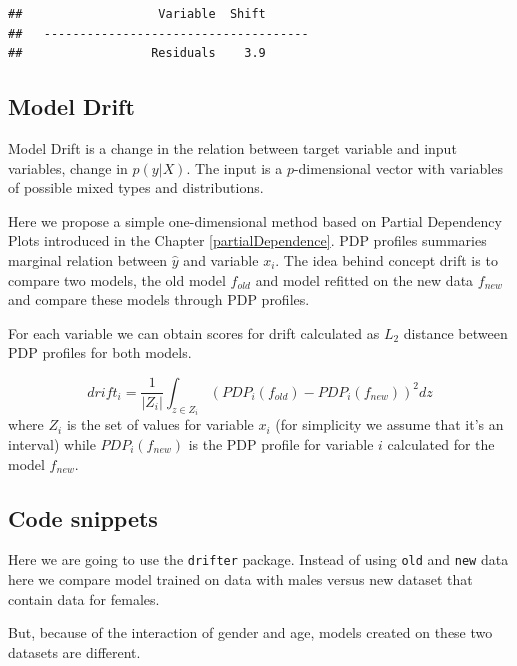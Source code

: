 \documentclass[12pt,]{krantz}
\theoremstyle{definition}
\theoremstyle{definition}
\theoremstyle{definition}
\theoremstyle{remark}
\begin{document}
\begin{verbatim}
##                   Variable  Shift
##   -------------------------------------
##                  Residuals    3.9
\end{verbatim}

\hypertarget{model-drift}{%
\subsection{Model Drift}\label{model-drift}}

Model Drift is a change in the relation between target variable and
input variables, change in \(p(y|X)\). The input is a \(p\)-dimensional
vector with variables of possible mixed types and distributions.

Here we propose a simple one-dimensional method based on Partial
Dependency Plots introduced in the Chapter \ref{partialDependence}. PDP
profiles summaries marginal relation between \(\hat y\) and variable
\(x_i\). The idea behind concept drift is to compare two models, the old
model \(f_{old}\) and model refitted on the new data \(f_{new}\) and
compare these models through PDP profiles.

For each variable we can obtain scores for drift calculated as \(L_2\)
distance between PDP profiles for both models.

\[
drift_{i} = \frac 1 {|Z_i|}\int_{z\in Z_i} (PDP_i(f_{old}) - PDP_i(f_{new}))^2 dz
\] where \(Z_i\) is the set of values for variable \(x_i\) (for
simplicity we assume that it's an interval) while \(PDP_i(f_{new})\) is
the PDP profile for variable \(i\) calculated for the model \(f_{new}\).

\hypertarget{code-snippets-2}{%
\subsection{Code snippets}\label{code-snippets-2}}

Here we are going to use the \texttt{drifter} package. Instead of using
\texttt{old} and \texttt{new} data here we compare model trained on data
with males versus new dataset that contain data for females.

But, because of the interaction of gender and age, models created on
these two datasets are different.
\end{document}
